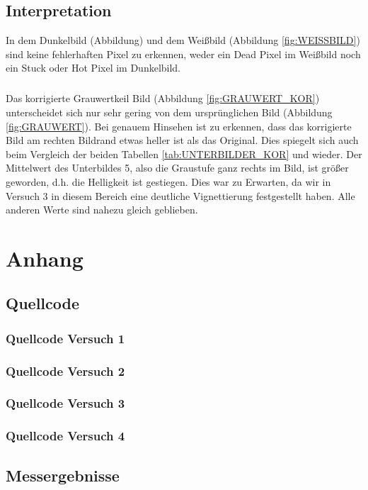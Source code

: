 \documentclass[12pt,oneside,a4paper]{report}
\begin{document}
\section{Interpretation}
\label{chap:VERSUCH_4_INTERPRETATION}

In dem Dunkelbild (Abbildung) und dem Weißbild (Abbildung \ref{fig:WEISSBILD}) sind keine fehlerhaften Pixel zu erkennen, weder ein Dead Pixel im Weißbild noch ein Stuck oder Hot Pixel im Dunkelbild.

\paragraph{}
Das korrigierte Grauwertkeil Bild (Abbildung \ref{fig:GRAUWERT_KOR}) unterscheidet sich nur sehr gering von dem ursprünglichen Bild (Abbildung \ref{fig:GRAUWERT}). Bei genauem Hinsehen ist zu erkennen, dass das korrigierte Bild am rechten Bildrand etwas heller ist als das Original. Dies spiegelt sich auch beim Vergleich der beiden Tabellen \ref{tab:UNTERBILDER_KOR} und wieder. Der Mittelwert des Unterbildes 5, also die Graustufe ganz rechts im Bild, ist größer geworden, d.h. die Helligkeit ist gestiegen.
Dies war zu Erwarten, da wir in Versuch 3 in diesem Bereich eine deutliche Vignettierung festgestellt haben. Alle anderen Werte sind nahezu gleich geblieben.
%
%
\renewcommand\thesection{A.\arabic{section}}
\renewcommand\thesubsection{\thesection.\arabic{subsection}}

\chapter*{Anhang}
\label{chap:APPENDIX}
\addtocounter{chapter}{1}
\setcounter{section}{0}

\section{Quellcode}
\label{chap:APPENDIX_SOURCECODE}

\subsection{Quellcode Versuch 1}
\label{chap:APPENDIX_SOURCECODE_V1}

\subsection{Quellcode Versuch 2}
\label{chap:APPENDIX_SOURCECODE_V2}

\subsection{Quellcode Versuch 3}
\label{chap:APPENDIX_SOURCECODE_V3}

\subsection{Quellcode Versuch 4}
\label{chap:APPENDIX_SOURCECODE_V4}


\section{Messergebnisse}
\label{chap:APPENDIX_MEASUREMENT_SOURCE}

%
%

\end{document}

